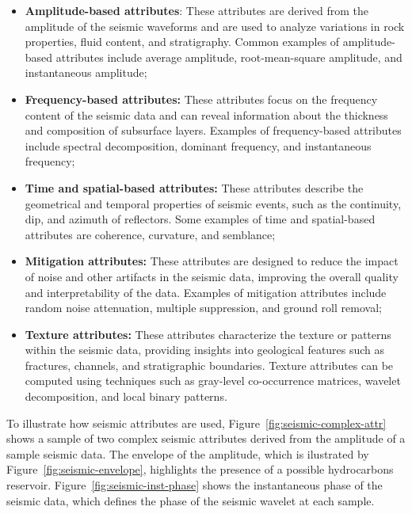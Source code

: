 \begin{itemize}
    \item \textbf{Amplitude-based attributes}: These attributes are derived from the amplitude of the seismic waveforms and are used to analyze variations in rock properties, fluid content, and stratigraphy.
        Common examples of amplitude-based attributes include average amplitude, root-mean-square amplitude, and instantaneous amplitude;
    \item \textbf{Frequency-based attributes:} These attributes focus on the frequency content of the seismic data and can reveal information about the thickness and composition of subsurface layers.
        Examples of frequency-based attributes include spectral decomposition, dominant frequency, and instantaneous frequency;
    \item \textbf{Time and spatial-based attributes:} These attributes describe the geometrical and temporal properties of seismic events, such as the continuity, dip, and azimuth of reflectors.
        Some examples of time and spatial-based attributes are coherence, curvature, and semblance;
    \item \textbf{Mitigation attributes:} These attributes are designed to reduce the impact of noise and other artifacts in the seismic data, improving the overall quality and interpretability of the data.
        Examples of mitigation attributes include random noise attenuation, multiple suppression, and ground roll removal;
    \item \textbf{Texture attributes:} These attributes characterize the texture or patterns within the seismic data, providing insights into geological features such as fractures, channels, and stratigraphic boundaries.
        Texture attributes can be computed using techniques such as gray-level co-occurrence matrices, wavelet decomposition, and local binary patterns.
\end{itemize}

To illustrate how seismic attributes are used, Figure~\ref{fig:seismic-complex-attr} shows a sample of two complex seismic attributes derived from the amplitude of a sample seismic data.
The envelope of the amplitude, which is ilustrated by Figure~\ref{fig:seismic-envelope}, highlights the presence of a possible hydrocarbons reservoir.
Figure~\ref{fig:seismic-inst-phase} shows the instantaneous phase of the seismic data, which defines the phase of the seismic wavelet at each sample.

